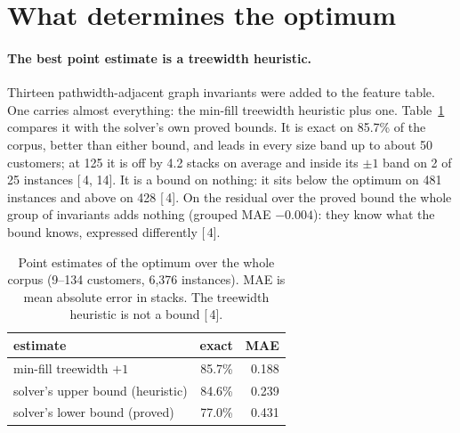 \documentclass[11pt,a4paper]{article}
\renewcommand{\S}[1]{[\textsection\,#1]}
\begin{document}
\section{What determines the optimum}
\label{sec:optimum}

\paragraph{The best point estimate is a treewidth heuristic.}
Thirteen pathwidth-adjacent graph invariants were added to the feature
table. One carries almost everything: the min-fill treewidth heuristic plus
one. Table~\ref{tab:estimate} compares it with the solver's own proved
bounds. It is exact on 85.7\% of the corpus, better than either bound, and
leads in every size band up to about 50 customers; at 125 it is off by 4.2
stacks on average and inside its $\pm 1$ band on 2 of 25 instances \S{4, 14}.
It is a bound on nothing: it sits below the optimum on 481 instances and
above on 428 \S{4}. On the residual over the proved bound the whole group of
invariants adds nothing (grouped MAE $-0.004$): they know what the bound
knows, expressed differently \S{4}.

\begin{table}[t]
\centering
\small
\caption{Point estimates of the optimum over the whole corpus (9--134
customers, 6,376 instances). MAE is mean absolute error in stacks. The
treewidth heuristic is not a bound \S{4}.}
\label{tab:estimate}
\begin{tabular}{lrr}
\toprule
estimate & exact & MAE \\
\midrule
min-fill treewidth $+1$ & 85.7\% & 0.188 \\
solver's upper bound (heuristic) & 84.6\% & 0.239 \\
solver's lower bound (proved) & 77.0\% & 0.431 \\
\bottomrule
\end{tabular}
\end{table}
\end{document}
